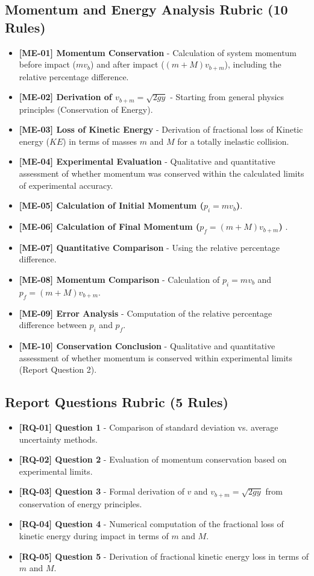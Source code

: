 \documentclass{article}
\begin{document}
\subsection*{Momentum and Energy Analysis Rubric (10 Rules)}
\begin{itemize}
\item \textbf{ [ME-01] Momentum Conservation } - Calculation of system momentum before impact ($mv_b$) and after impact ($(m + M)v_{b+m}$), including the relative percentage difference.
\item \textbf{ [ME-02] Derivation of $v_{b+m} = \sqrt{2gy}$ } - Starting from general physics principles (Conservation of Energy).
\item \textbf{ [ME-03] Loss of Kinetic Energy } - Derivation of fractional loss of Kinetic energy ($KE$) in terms of masses $m$ and $M$ for a totally inelastic collision.
\item \textbf{ [ME-04] Experimental Evaluation } - Qualitative and quantitative assessment of whether momentum was conserved within the calculated limits of experimental accuracy.
\item \textbf{ [ME-05] Calculation of Initial Momentum ($p_i = mv_b$)}.
\item \textbf{ [ME-06] Calculation of Final Momentum ($p_f = (m+M)v_{b+m}$) }.
\item \textbf{ [ME-07] Quantitative Comparison } - Using the relative percentage difference.
\item \textbf{ [ME-08] Momentum Comparison } - Calculation of $p_i = m v_b$ and $p_f = (m + M) v_{b+m}$.
\item \textbf{ [ME-09] Error Analysis } - Computation of the relative percentage difference between $p_i$ and $p_f$.
\item \textbf{ [ME-10] Conservation Conclusion } - Qualitative and quantitative assessment of whether momentum is conserved within experimental limits (Report Question 2).
\end{itemize}

\subsection*{Report Questions Rubric (5 Rules)}
\begin{itemize}
\item \textbf{ [RQ-01] Question 1 } - Comparison of standard deviation vs. average uncertainty methods.
\item \textbf{ [RQ-02] Question 2 } - Evaluation of momentum conservation based on experimental limits.
\item \textbf{ [RQ-03] Question 3 } - Formal derivation of $v$ and $v_{b+m} = \sqrt{2gy}$ from conservation of energy principles.
\item \textbf{ [RQ-04] Question 4 } - Numerical computation of the fractional loss of kinetic energy during impact in terms of $m$ and $M$.
\item \textbf{ [RQ-05] Question 5 } - Derivation of fractional kinetic energy loss in terms of $m$ and $M$.
\end{itemize}
\end{document}
